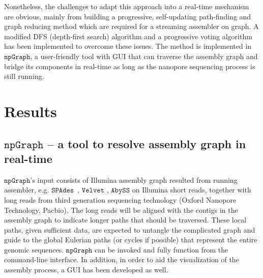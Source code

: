 \documentclass[10pt,twocolumn,twoside]{genpaper}
\newcommand{\npgraph}{$\mathtt{npGraph}$}
\newcommand{\spades}{$\mathtt{SPAdes}$}
\begin{document}
Nonetheless, the challenges to adapt this approach into a real-time mechanism are obvious, mainly from building a progressive, self-updating path-finding and graph reducing method which are required for a streaming assembler on graph. 
A modified DFS (depth-first search) algorithm and a progressive voting algorithm has been implemented to overcome these issues.
The method is implemented in \npgraph{}, a user-friendly tool with GUI that can traverse the assembly graph and bridge its components in real-time as long as the nanopore sequencing process is still running.  
\section*{Results}
\subsection*{\npgraph{} -- a tool to resolve assembly graph in real-time}
\npgraph{}'s input consists of Illumina assembly graph resulted from running assembler, e.g. \spades{}~\cite{BankevichNA2012}, $\mathtt{Velvet}$ \cite{Zerbino2008}, $\mathtt{AbySS}$ \cite{Simpson2009} on Illumina short reads, together with long reads from third generation sequencing technology (Oxford Nanopore Technology, Pacbio).
The long reads will be aligned with the contigs in the assembly graph to indicate longer paths that should be traversed. These local paths, given sufficient data, are expected to untangle the complicated graph and guide to the global Eulerian paths (or cycles if possible) that represent the entire genomic sequences. 
\npgraph{} can be invoked and fully function from the command-line interface. In addition, in order to aid the visualization of the assembly process, a GUI has been developed as well.
\end{document}
